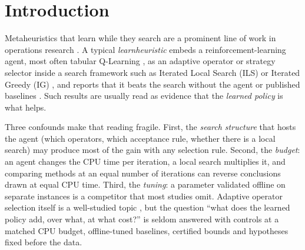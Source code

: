 \section{Introduction}
\label{sec:intro}


Metaheuristics that learn while they search are a prominent line of work in operations research \citep{CalvetEtal2017,KarimiMamaghanEtal2022}. A typical \emph{learnheuristic} embeds a
reinforcement-learning agent, most often tabular Q-Learning \citep{WatkinsDayan1992,SuttonBarto2018}, as an adaptive operator or strategy selector inside a search framework such as
Iterated Local Search (ILS) \citep{LourencaoEtal2019} or Iterated Greedy (IG) \citep{RuizStutzle2007}, and reports that it beats the search without the agent or published baselines
\citep{KarimiMamaghanEtal2023,MissaouiOSullivan2026}. Such results are usually read as evidence that the \emph{learned policy} is what helps.

Three confounds make that reading fragile. First, the \emph{search structure} that hosts the agent (which operators, which acceptance rule, whether there is a local search) may produce
most of the gain with any selection rule. Second, the \emph{budget}: an agent changes the CPU time per iteration, a local search multiplies it, and comparing methods at an equal number of
iterations can reverse conclusions drawn at equal CPU time. Third, the \emph{tuning}: a parameter validated offline on separate instances is a competitor that most studies omit. Adaptive operator
selection itself is a well-studied topic \citep{FialhoEtal2010,PisingerRopke2007}, but the question ``what does the learned policy add, over what, at what cost?'' is seldom answered with controls
at a matched CPU budget, offline-tuned baselines, certified bounds and hypotheses fixed before the data.


